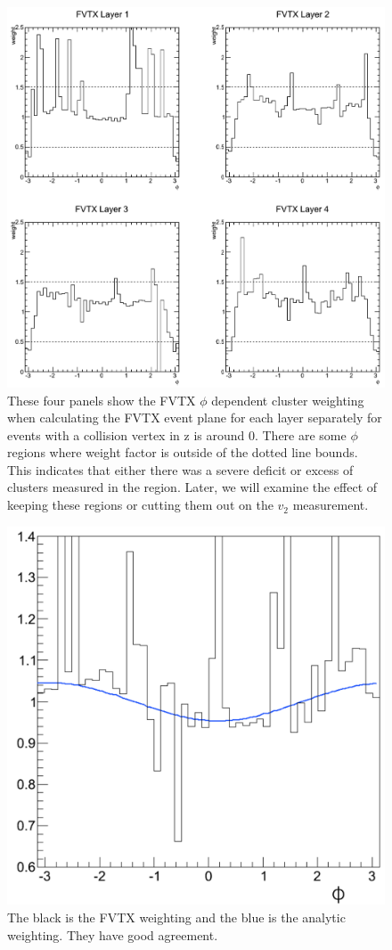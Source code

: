 \begin{figure}[!ht]
\centering
\includegraphics[width=0.75\linewidth]{figs/fvtx_weighting.png}
\caption{These four panels show the FVTX $\phi$ dependent cluster weighting when calculating the FVTX event plane for each layer separately for events with a collision vertex in z is around 0. There are some $\phi$ regions where weight factor is outside of the dotted line bounds. This indicates that either there was a severe deficit or excess of clusters measured in the region. Later, we will examine the effect of keeping these regions or cutting them out on the $v_2$ measurement.}
\label{fig:fvtx_weighting}
\end{figure}
\begin{figure}[!ht]
\centering
\includegraphics[width=0.5\linewidth]{figs/comparison_of_weights.png}
\caption{The black is the FVTX weighting and the blue is the analytic weighting. They have good agreement.}
\label{fig:analytic_comparison}
\end{figure}

